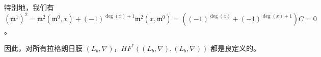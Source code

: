 

特别地，我们有 $\left(\mathfrak{m}^1\right)^2=\mathfrak{m}^2 (\mathfrak{m}^0,x)+(-1)^{\deg (x)+1}\mathfrak{m}^2 (x,\mathfrak{m}^0)=((-1)^{\deg (x)}+(-1)^{\deg (x)+1})C=0$。


因此，对所有拉格朗日膜 $(L_b,\nabla)$，$HF^{\ast} ((L_b,\nabla),(L_b,\nabla))$ 都是良定义的。

